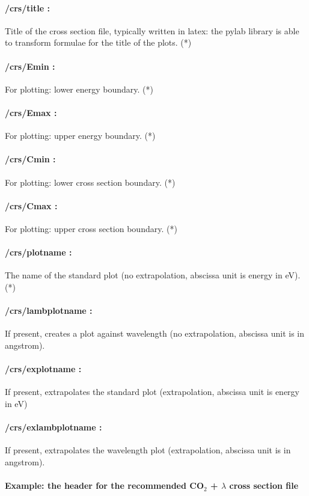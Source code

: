 \paragraph{/crs/title :} Title of the cross section file, typically written in latex: the pylab library is able to transform formulae for the title of the plots. (*)
\paragraph{/crs/Emin :} For plotting: lower energy boundary. (*)
\paragraph{/crs/Emax :} For plotting: upper energy boundary. (*)
\paragraph{/crs/Cmin :} For plotting: lower cross section boundary. (*)
\paragraph{/crs/Cmax :} For plotting: upper cross section boundary. (*)
\paragraph{/crs/plotname :} The name of the standard plot (no extrapolation, abscissa unit is energy in eV). (*)
\paragraph{/crs/lambplotname :} If present, creates a plot against wavelength (no extrapolation, abscissa unit is in angstrom).
\paragraph{/crs/explotname :} If present, extrapolates the standard plot (extrapolation, abscissa unit is energy in eV)
\paragraph{/crs/exlambplotname :} If present, extrapolates the wavelength plot (extrapolation, abscissa unit is in angstrom).




\paragraph{Example: the header for the recommended CO$_2$ + $\lambda$ cross section file}


